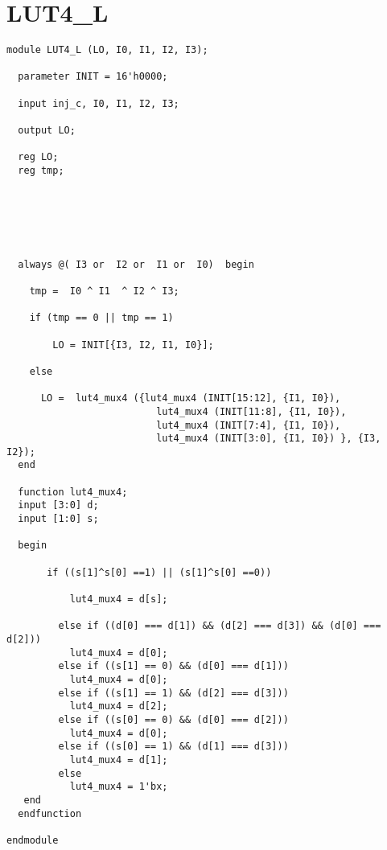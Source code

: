 \section{LUT4\_L}
\begin{lstlisting}
module LUT4_L (LO, I0, I1, I2, I3);

  parameter INIT = 16'h0000;

  input inj_c, I0, I1, I2, I3;

  output LO;

  reg LO;
  reg tmp;

  
 
  

  
  always @( I3 or  I2 or  I1 or  I0)  begin
 
    tmp =  I0 ^ I1  ^ I2 ^ I3;

    if (tmp == 0 || tmp == 1)

        LO = INIT[{I3, I2, I1, I0}];

    else 
    
      LO =  lut4_mux4 ({lut4_mux4 (INIT[15:12], {I1, I0}),
                          lut4_mux4 (INIT[11:8], {I1, I0}),
                          lut4_mux4 (INIT[7:4], {I1, I0}),
                          lut4_mux4 (INIT[3:0], {I1, I0}) }, {I3, I2});
  end

  function lut4_mux4;
  input [3:0] d;
  input [1:0] s;
   
  begin

       if ((s[1]^s[0] ==1) || (s[1]^s[0] ==0))
           
           lut4_mux4 = d[s];

         else if ((d[0] === d[1]) && (d[2] === d[3]) && (d[0] === d[2])) 
           lut4_mux4 = d[0];
         else if ((s[1] == 0) && (d[0] === d[1]))
           lut4_mux4 = d[0];
         else if ((s[1] == 1) && (d[2] === d[3])) 
           lut4_mux4 = d[2];
         else if ((s[0] == 0) && (d[0] === d[2])) 
           lut4_mux4 = d[0];
         else if ((s[0] == 1) && (d[1] === d[3]))
           lut4_mux4 = d[1];
         else
           lut4_mux4 = 1'bx;
   end
  endfunction

endmodule


\end{lstlisting}

